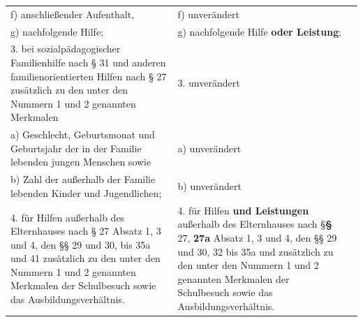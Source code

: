 \documentclass[10pt,a4paper,landscape]{article}
\begin{document}
\begin{longtable}{|L{8.2cm}|L{8.2cm}|L{8.2cm}|}
\hhline{|---|}
f)   \newline anschließender Aufenthalt, & f) unverändert &  \\
\hhline{|---|}
g)   \newline nachfolgende Hilfe; & g)   \newline nachfolgende Hilfe \textbf{\textcolor{diffred}{oder Leistung}}; &  \\
\hhline{|---|}
3.   \newline bei sozialpädagogischer Familienhilfe nach  \newline \S{} 31 und anderen familienorientierten  \newline Hilfen nach \S{} 27 zusätzlich zu den unter  \newline den Nummern 1 und 2 genannten  \newline Merkmalen & 3. unverändert &  \\
\hhline{|---|}
a)   \newline Geschlecht, Geburtsmonat und  \newline Geburtsjahr der in der Familie lebenden  \newline jungen Menschen sowie & a) unverändert &  \\
\hhline{|---|}
b)   \newline Zahl der außerhalb der Familie lebenden  \newline Kinder und Jugendlichen; & b) unverändert &  \\
\hhline{|---|}
4.   \newline für Hilfen außerhalb des Elternhauses nach  \newline \S{} 27 Absatz 1, 3 und 4, den \S{}\S{} 29 und 30,   bis 35a und 41 zusätzlich zu den unter  \newline den Nummern 1 und 2 genannten  \newline Merkmalen der Schulbesuch sowie das  \newline Ausbildungsverhältnis. & 4.   \newline für Hilfen \textbf{\textcolor{diffred}{und Leistungen }}außerhalb des  \newline Elternhauses nach \S{}\textbf{\textcolor{diffred}{\S{}}} 27, \textbf{\textcolor{diffred}{27a}} Absatz 1, 3  \newline und 4, den \S{}\S{} 29 und 30, 32 bis 35a und   zusätzlich zu den unter den Nummern 1  \newline und 2 genannten Merkmalen der  \newline Schulbesuch sowie das  \newline Ausbildungsverhältnis. &  \\

\end{longtable}
\end{document}
